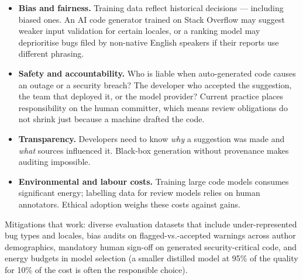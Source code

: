 \begin{itemize}[leftmargin=1.2em, itemsep=0.35em]
  \item \textbf{Bias and fairness.} Training data reflect historical decisions --- including biased ones. An AI code generator trained on Stack Overflow may suggest weaker input validation for certain locales, or a ranking model may deprioritise bugs filed by non-native English speakers if their reports use different phrasing.
  \item \textbf{Safety and accountability.} Who is liable when auto-generated code causes an outage or a security breach? The developer who accepted the suggestion, the team that deployed it, or the model provider? Current practice places responsibility on the human committer, which means review obligations do not shrink just because a machine drafted the code.
  \item \textbf{Transparency.} Developers need to know \emph{why} a suggestion was made and \emph{what} sources influenced it. Black-box generation without provenance makes auditing impossible.
  \item \textbf{Environmental and labour costs.} Training large code models consumes significant energy; labelling data for review models relies on human annotators. Ethical adoption weighs these costs against gains.
\end{itemize}

Mitigations that work: diverse evaluation datasets that include under-represented bug types and locales, bias audits on flagged-vs.-accepted warnings across author demographics, mandatory human sign-off on generated security-critical code, and energy budgets in model selection (a smaller distilled model at 95\% of the quality for 10\% of the cost is often the responsible choice).

